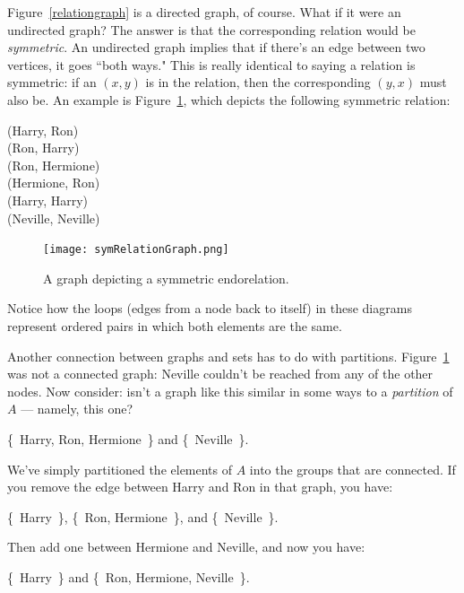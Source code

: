 Figure~\ref{relationgraph} is a directed graph, of course. What if it were
an undirected graph? The answer is that the corresponding relation would be
\textit{symmetric}. An undirected graph implies that if there's an edge
between two vertices, it goes ``both ways." This is really identical to
saying a relation is symmetric: if an $(x,y)$ is in the relation, then the
corresponding $(y,x)$ must also be. An example is
Figure~\ref{symrelationgraph}, which depicts the following symmetric
relation:

\begin{center}
(Harry, Ron) \\
(Ron, Harry) \\
(Ron, Hermione) \\
(Hermione, Ron) \\
(Harry, Harry) \\
(Neville, Neville)
\end{center}

\begin{figure}[ht]
\centering
\texttt{[image: symRelationGraph.png]}
\caption{A graph depicting a symmetric endorelation.}
\label{symrelationgraph}
\end{figure}

Notice how the loops (edges from a node back to itself) in these diagrams
represent ordered pairs in which both elements are the same.

Another connection between graphs and sets has to do with partitions.
Figure~\ref{symrelationgraph} was not a connected graph: Neville couldn't
be reached from any of the other nodes. Now consider: isn't a graph like
this similar in some ways to a \textit{partition} of $A$ --- namely, this
one?

\begin{center}
\{~Harry, Ron, Hermione~\} and
\{~Neville~\}.
\end{center}

We've simply partitioned the elements of $A$ into the groups that are
connected. If you remove the edge between Harry and Ron in that graph, you
have:

\begin{center}
\{~Harry~\},
\{~Ron, Hermione~\}, and
\{~Neville~\}.
\end{center}

Then add one between Hermione and Neville, and now you have:

\begin{center}
\{~Harry~\} and
\{~Ron, Hermione, Neville~\}.
\end{center}

